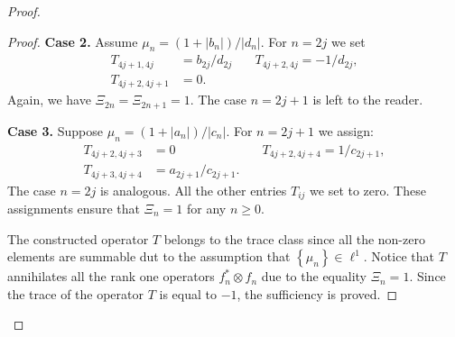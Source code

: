 \documentclass[12pt]{amsart}
\theoremstyle{case}
\begin{document}
\begin{proof}
\begin{proof}
      \noindent\textbf{Case 2.} Assume $\mu_n = (1 + |b_n|)/|d_n|$. 
      For $n=2j$ we set
      \begin{align*}
        T_{4j+1,4j} &= b_{2j}/d_{2j} & \quad T_{4j+2,4j} = -1/d_{2j},\\
        T_{4j+2,4j+1} &= 0.
      \end{align*}
      Again, we have $\Xi_{2n} = \Xi_{2n+1} = 1$.
      The case $n = 2j + 1$ is left to the reader.

      \noindent\textbf{Case 3.} Suppose $\mu_n = (1 + |a_n|)/|c_n|$. 
      For $n = 2j + 1$ we assign:
      \begin{align*}
        T_{4j+2,4j+3} &= 0 & \quad T_{4j+2,4j+4} = 1/c_{2j+1},\\
        T_{4j+3,4j+4} &= a_{2j+1}/c_{2j+1}.
      \end{align*}
      The case $n = 2j$ is analogous.
      \medskip
      All the other entries $T_{ij}$ we set to zero.
      These assignments ensure that $\Xi_n = 1$ for any $n \geq 0$.

      The constructed operator $T$ belongs to the trace class since all the non-zero elements are summable 
        dut to the assumption that $\left\{\mu_n\right\} \in \ell^1$.
      Notice that $T$ annihilates all the rank one operators $f^*_n \otimes f_n$ due to the equality $\Xi_n = 1$.
      Since the trace of the operator $T$ is equal to $-1$, the sufficiency is proved.


\end{proof}
\end{proof}
\end{document}
